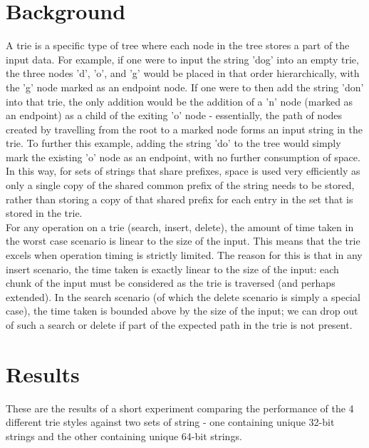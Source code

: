 \documentclass{llncs}
\begin{document}
\section{Background}
A trie is a specific type of tree where each node in the tree stores a part of the input data. For example, if one were to input the string 'dog' into an empty trie, the three nodes 'd', 'o', and 'g' would be placed in that order hierarchically, with the 'g' node marked as an endpoint node. If one were to then add the string 'don' into that trie, the only addition would be the addition of a 'n' node (marked as an endpoint) as a child of the exiting 'o' node - essentially, the path of nodes created by travelling from the root to a marked node forms an input string in the trie. To further this example, adding the string 'do' to the tree would simply mark the existing 'o' node as an endpoint, with no further consumption of space. In this way, for sets of strings that share prefixes, space is used very efficiently as only a single copy of the shared common prefix of the string needs to be stored, rather than storing a copy of that shared prefix for each entry in the set that is stored in the trie. \\ %
For any operation on a trie (search, insert, delete), the amount of time taken in the worst case scenario is linear to the size of the input. This means that the trie excels when operation timing is strictly limited. The reason for this is that in any insert scenario, the time taken is exactly linear to the size of the input: each chunk of the input must be considered as the trie is traversed (and perhaps extended). In the search scenario (of which the delete scenario is simply a special case), the time taken is bounded above by the size of the input; we can drop out of such a search or delete if part of the expected path in the trie is not present. \\
\newpage
\section{Results}
These are the results of a short experiment comparing the performance of the 4 different trie styles against two sets of string - one containing unique 32-bit strings and the other containing unique 64-bit strings.

\newpage
\end{document}
